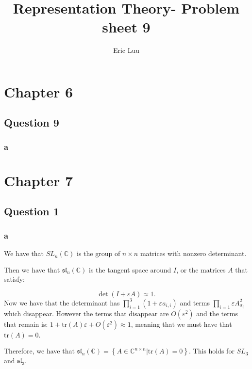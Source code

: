 \documentclass[]{article}
\title{Representation Theory- Problem sheet 9}
\author{Eric Luu}
\newcommand{\tr}{\text{tr}}
\begin{document}
\maketitle

\section*{Chapter 6}
\subsection*{Question 9}

\subsubsection*{a}

\section*{Chapter 7}
\subsection*{Question 1}

\subsubsection*{a}
We have that $SL_n(\mathbb{C})$ is the group of $n \times n$ matrices with nonzero determinant. 

Then we have that $\mathfrak{sl}_n(\mathbb{C})$ is the tangent space around $I$, or the matrices $A$ that satisfy:

\begin{equation}
	\det \left(I + \varepsilon A\right) \approx 1.
\end{equation}
Now we have that the determinant has $\prod_{i = 1}^3 ( 1 + \varepsilon a_{i,i})$ and terms $\prod_{i = 1} \varepsilon A_{\sigma_i}^2$ which disappear. However the terms that disappear are $O(\varepsilon^2)$ and the terms that remain is: $1 + \tr(A) \varepsilon + O(\varepsilon^2) \approx 1$, meaning that we must have that $\tr(A) = 0$. 

Therefore, we have that $\mathfrak{sl}_n(\mathbb{C}) = \left\{A \in \mathbb{C}^{n \times n} | \tr(A) = 0\right\}$.
This holds for $SL_3$ and $\mathfrak{sl}_3$. 
\end{document}
